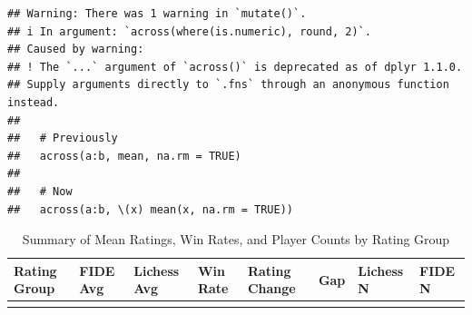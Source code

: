 \documentclass[
]{article}
\begin{document}
\begin{verbatim}
## Warning: There was 1 warning in `mutate()`.
## i In argument: `across(where(is.numeric), round, 2)`.
## Caused by warning:
## ! The `...` argument of `across()` is deprecated as of dplyr 1.1.0.
## Supply arguments directly to `.fns` through an anonymous function instead.
## 
##   # Previously
##   across(a:b, mean, na.rm = TRUE)
## 
##   # Now
##   across(a:b, \(x) mean(x, na.rm = TRUE))
\end{verbatim}

\begin{longtable}[]{@{}
  >{\raggedright\arraybackslash}p{}
  >{\raggedleft\arraybackslash}p{}
  >{\raggedleft\arraybackslash}p{}
  >{\raggedleft\arraybackslash}p{}
  >{\raggedleft\arraybackslash}p{}
  >{\raggedleft\arraybackslash}p{}
  >{\raggedleft\arraybackslash}p{}
  >{\raggedleft\arraybackslash}p{}@{}}
\caption{Summary of Mean Ratings, Win Rates, and Player Counts by Rating
Group}\tabularnewline
\toprule\noalign{}
\begin{minipage}[b]{\linewidth}\raggedright
Rating Group
\end{minipage} & \begin{minipage}[b]{\linewidth}\raggedleft
FIDE Avg
\end{minipage} & \begin{minipage}[b]{\linewidth}\raggedleft
Lichess Avg
\end{minipage} & \begin{minipage}[b]{\linewidth}\raggedleft
Win Rate
\end{minipage} & \begin{minipage}[b]{\linewidth}\raggedleft
Rating Change
\end{minipage} & \begin{minipage}[b]{\linewidth}\raggedleft
Gap
\end{minipage} & \begin{minipage}[b]{\linewidth}\raggedleft
Lichess N
\end{minipage} & \begin{minipage}[b]{\linewidth}\raggedleft
FIDE N
\end{minipage} \\
\midrule\noalign{}

\end{longtable}
\end{document}
